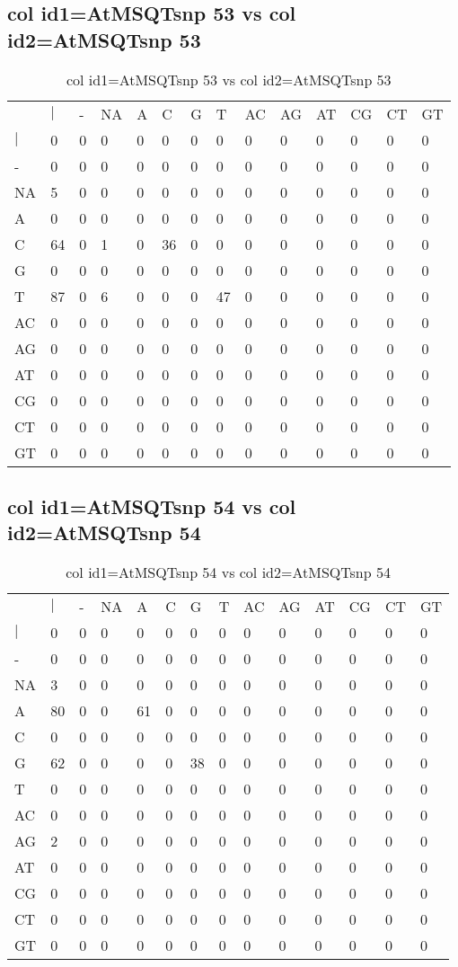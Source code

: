 \subsection{col id1=AtMSQTsnp 53 vs col id2=AtMSQTsnp 53}
\begin{center}
\begin{longtable}{|l|l|l|l|l|l|l|l|l|l|l|l|l|l|}
\caption{col id1=AtMSQTsnp 53 vs col id2=AtMSQTsnp 53} \label{table_dm748}\\
\hline
\\
\hline
&$|$&-&NA&A&C&G&T&AC&AG&AT&CG&CT&GT\\
$|$&0&0&0&0&0&0&0&0&0&0&0&0&0\\
-&0&0&0&0&0&0&0&0&0&0&0&0&0\\
NA&5&0&0&0&0&0&0&0&0&0&0&0&0\\
A&0&0&0&0&0&0&0&0&0&0&0&0&0\\
C&64&0&1&0&36&0&0&0&0&0&0&0&0\\
G&0&0&0&0&0&0&0&0&0&0&0&0&0\\
T&87&0&6&0&0&0&47&0&0&0&0&0&0\\
AC&0&0&0&0&0&0&0&0&0&0&0&0&0\\
AG&0&0&0&0&0&0&0&0&0&0&0&0&0\\
AT&0&0&0&0&0&0&0&0&0&0&0&0&0\\
CG&0&0&0&0&0&0&0&0&0&0&0&0&0\\
CT&0&0&0&0&0&0&0&0&0&0&0&0&0\\
GT&0&0&0&0&0&0&0&0&0&0&0&0&0\\
\hline
\end{longtable}
\end{center}

\subsection{col id1=AtMSQTsnp 54 vs col id2=AtMSQTsnp 54}
\begin{center}
\begin{longtable}{|l|l|l|l|l|l|l|l|l|l|l|l|l|l|}
\caption{col id1=AtMSQTsnp 54 vs col id2=AtMSQTsnp 54} \label{table_dm750}\\
\hline
\\
\hline
&$|$&-&NA&A&C&G&T&AC&AG&AT&CG&CT&GT\\
$|$&0&0&0&0&0&0&0&0&0&0&0&0&0\\
-&0&0&0&0&0&0&0&0&0&0&0&0&0\\
NA&3&0&0&0&0&0&0&0&0&0&0&0&0\\
A&80&0&0&61&0&0&0&0&0&0&0&0&0\\
C&0&0&0&0&0&0&0&0&0&0&0&0&0\\
G&62&0&0&0&0&38&0&0&0&0&0&0&0\\
T&0&0&0&0&0&0&0&0&0&0&0&0&0\\
AC&0&0&0&0&0&0&0&0&0&0&0&0&0\\
AG&2&0&0&0&0&0&0&0&0&0&0&0&0\\
AT&0&0&0&0&0&0&0&0&0&0&0&0&0\\
CG&0&0&0&0&0&0&0&0&0&0&0&0&0\\
CT&0&0&0&0&0&0&0&0&0&0&0&0&0\\
GT&0&0&0&0&0&0&0&0&0&0&0&0&0\\
\hline
\end{longtable}
\end{center}

